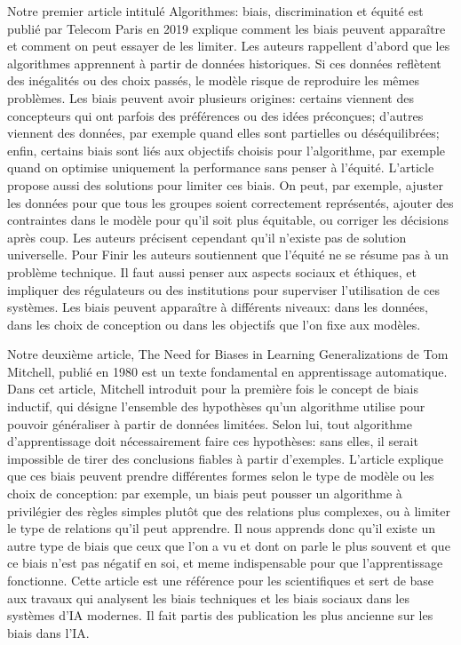 \documentclass{article}
\begin{document}
Notre premier article intitulé Algorithmes: biais, discrimination et équité\citep{ageneral2023} est publié par Telecom Paris en 2019 explique comment les biais peuvent apparaître et comment on peut essayer de les limiter. Les auteurs rappellent d’abord que les algorithmes apprennent à partir de données historiques. Si ces données reflètent des inégalités ou des choix passés, le modèle risque de reproduire les mêmes problèmes. Les biais peuvent avoir plusieurs origines: certains viennent des concepteurs qui ont parfois des préférences ou des idées préconçues; d’autres viennent des données, par exemple quand elles sont partielles ou déséquilibrées; enfin, certains biais sont liés aux objectifs choisis pour l’algorithme, par exemple quand on optimise uniquement la performance sans penser à l’équité. L’article propose aussi des solutions pour limiter ces biais. On peut, par exemple, ajuster les données pour que tous les groupes soient correctement représentés, ajouter des contraintes dans le modèle pour qu’il soit plus équitable, ou corriger les décisions après coup. Les auteurs précisent cependant qu’il n’existe pas de solution universelle. Pour Finir les auteurs soutiennent que l’équité ne se résume pas à un problème technique. Il faut aussi penser aux aspects sociaux et éthiques, et impliquer des régulateurs ou des institutions pour superviser l’utilisation de ces systèmes. Les biais peuvent apparaître à différents niveaux: dans les données, dans les choix de conception ou dans les objectifs que l’on fixe aux modèles.

Notre deuxième article, The Need for Biases in Learning Generalizations\citep{Mitchell1980} de Tom Mitchell, publié en 1980 est un texte fondamental en apprentissage automatique. Dans cet article, Mitchell introduit pour la première fois le concept de biais inductif, qui désigne l’ensemble des hypothèses qu’un algorithme utilise pour pouvoir généraliser à partir de données limitées. Selon lui, tout algorithme d’apprentissage doit nécessairement faire ces hypothèses: sans elles, il serait impossible de tirer des conclusions fiables à partir d’exemples.
L’article explique que ces biais peuvent prendre différentes formes selon le type de modèle ou les choix de conception: par exemple, un biais peut pousser un algorithme à privilégier des règles simples plutôt que des relations plus complexes, ou à limiter le type de relations qu’il peut apprendre. Il nous apprends donc qu’il existe un autre type de biais que ceux que l’on a vu et dont on parle le plus souvent et que ce biais n’est pas négatif en soi, et meme indispensable pour que l’apprentissage fonctionne. Cette article est une référence pour les scientifiques et sert de base aux travaux qui analysent les biais techniques et les biais sociaux dans les systèmes d’IA modernes. Il fait partis des publication les plus ancienne sur les biais dans l’IA.
\end{document}
